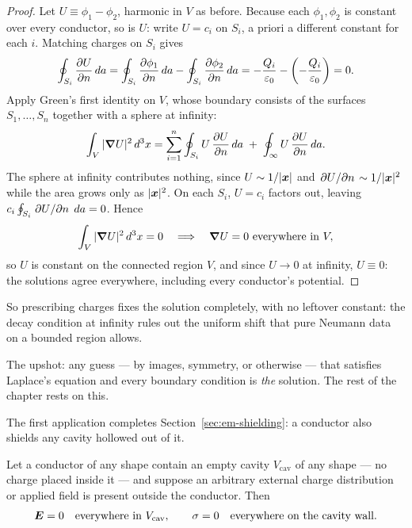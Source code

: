 \begin{proof}
Let $U \equiv \phi_1 - \phi_2$, harmonic in $V$ as before. Because each $\phi_1,\phi_2$ is constant over every conductor, so is $U$: write $U = c_i$ on $S_i$, a priori a different constant for each $i$. Matching charges on $S_i$ gives
\[
    \oint_{S_i} \pdv{U}{n}\,da = \oint_{S_i}\pdv{\phi_1}{n}\,da - \oint_{S_i}\pdv{\phi_2}{n}\,da
    = -\frac{Q_i}{\varepsilon_0} - \left(-\frac{Q_i}{\varepsilon_0}\right) = 0 .
\]
Apply Green's first identity on $V$, whose boundary consists of the surfaces $S_1,\dots,S_n$ together with a sphere at infinity:
\[
    \int_V |\grad U|^2\,d^3x = \sum_{i=1}^n \oint_{S_i} U\,\pdv{U}{n}\,da \;+\; \oint_{\infty} U\,\pdv{U}{n}\,da .
\]
The sphere at infinity contributes nothing, since $U\sim 1/|\bm{x}|$ and $\pdv*{U}{n}\sim 1/|\bm{x}|^2$ while the area grows only as $|\bm{x}|^2$. On each $S_i$, $U=c_i$ factors out, leaving $c_i\oint_{S_i}\pdv*{U}{n}\,da=0$. Hence
\[
    \int_V |\grad U|^2\,d^3x = 0 \quad\Longrightarrow\quad \grad U = 0 \text{ everywhere in } V,
\]
so $U$ is constant on the connected region $V$, and since $U\to 0$ at infinity, $U\equiv 0$: the solutions agree everywhere, including every conductor's potential.
\end{proof}

So prescribing charges fixes the solution completely, with no leftover constant: the decay condition at infinity rules out the uniform shift that pure Neumann data on a bounded region allows.

The upshot: any guess --- by images, symmetry, or otherwise --- that satisfies Laplace's equation and every boundary condition is \emph{the} solution. The rest of the chapter rests on this.

The first application completes Section~\ref{sec:em-shielding}: a conductor also shields any cavity hollowed out of it.

\begin{theorem}
\label{thm:em-faraday-cage}
Let a conductor of any shape contain an empty cavity $V_\text{cav}$ of any shape --- no charge placed inside it --- and suppose an arbitrary external charge distribution or applied field is present outside the conductor. Then
\[
    \vect{E} = 0 \quad\text{everywhere in } V_\text{cav}, \qquad \sigma = 0 \quad\text{everywhere on the cavity wall}.
\]
\end{theorem}


